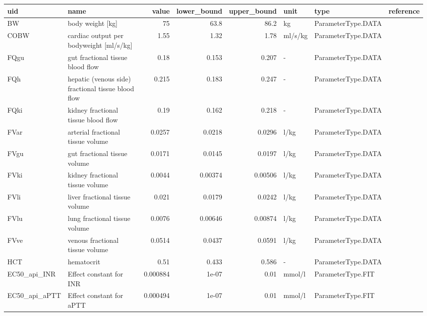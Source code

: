 \begin{tabular}{llrrrlll}
\toprule
uid & name & value & lower\_bound & upper\_bound & unit & type & reference \\
\midrule
BW & body weight [kg] & 75 & 63.8 & 86.2 & kg & ParameterType.DATA & \cite{Ogden2004, Jones2013, Thompson2009, Brown1997} \\
COBW & cardiac output per bodyweight [ml/s/kg] & 1.55 & 1.32 & 1.78 & ml/s/kg & ParameterType.DATA & \cite{Cattermole2017, Patel2021, Collis2001} \\
FQgu & gut fractional tissue blood flow & 0.18 & 0.153 & 0.207 & - & ParameterType.DATA & \cite{Jones2013, Thompson2009, Brown1997} \\
FQh & hepatic (venous side) fractional tissue blood flow & 0.215 & 0.183 & 0.247 & - & ParameterType.DATA & \cite{Jones2013, Wynne1989, Thompson2009, Brown1997} \\
FQki & kidney fractional tissue blood flow & 0.19 & 0.162 & 0.218 & - & ParameterType.DATA & \cite{Jones2013, Thompson2009, Brown1997} \\
FVar & arterial fractional tissue volume & 0.0257 & 0.0218 & 0.0296 & l/kg & ParameterType.DATA & \cite{Jones2013, Thompson2009, Brown1997} \\
FVgu & gut fractional tissue volume & 0.0171 & 0.0145 & 0.0197 & l/kg & ParameterType.DATA & \cite{Jones2013, Thompson2009, Brown1997} \\
FVki & kidney fractional tissue volume & 0.0044 & 0.00374 & 0.00506 & l/kg & ParameterType.DATA & \cite{Jones2013, Thompson2009, Brown1997} \\
FVli & liver fractional tissue volume & 0.021 & 0.0179 & 0.0242 & l/kg & ParameterType.DATA & \cite{Jones2013, Wynne1989, Thompson2009, Brown1997} \\
FVlu & lung fractional tissue volume & 0.0076 & 0.00646 & 0.00874 & l/kg & ParameterType.DATA & \cite{Jones2013, Thompson2009, Brown1997} \\
FVve & venous fractional tissue volume & 0.0514 & 0.0437 & 0.0591 & l/kg & ParameterType.DATA & \cite{Jones2013, Thompson2009, Brown1997} \\
HCT & hematocrit & 0.51 & 0.433 & 0.586 & - & ParameterType.DATA & \cite{Mondal2025, Fiseha2023} \\
EC50\_api\_INR & Effect constant for INR & 0.000884 & 1e-07 & 0.01 & mmol/l & ParameterType.FIT &  \\
EC50\_api\_aPTT & Effect constant for aPTT & 0.000494 & 1e-07 & 0.01 & mmol/l & ParameterType.FIT &  \\

\end{tabular}
